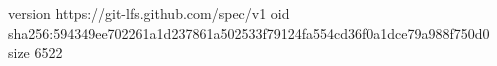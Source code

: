 version https://git-lfs.github.com/spec/v1
oid sha256:594349ee702261a1d237861a502533f79124fa554cd36f0a1dce79a988f750d0
size 6522
